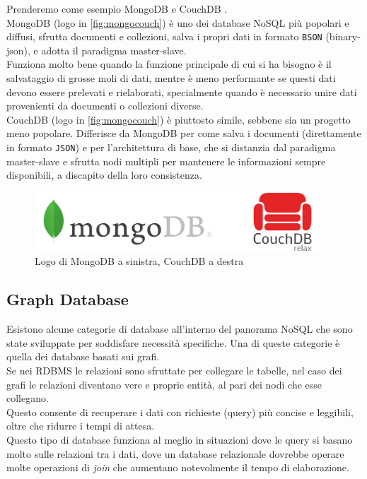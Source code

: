 \noindent Prenderemo come esempio MongoDB \cite{site:udemymongodb} e CouchDB \cite{site:udemycouchdb}.\\
MongoDB (logo in \autoref{fig:mongocouch}) è uno dei database NoSQL più popolari e diffusi, sfrutta documenti e collezioni, salva i propri dati in formato \texttt{BSON} (binary-json), e adotta il paradigma \gls{master-slave}.\\
Funziona molto bene quando la funzione principale di cui si ha bisogno è il salvataggio di grosse moli di dati, mentre è meno performante se questi dati devono essere prelevati e rielaborati, specialmente quando è necessario unire dati provenienti da documenti o collezioni diverse.\\
CouchDB (logo in \autoref{fig:mongocouch}) è piuttosto simile, sebbene sia un progetto meno popolare. Differisce da MongoDB per come salva i documenti (direttamente in formato \texttt{JSON}) e per l'architettura di base, che si distanzia dal paradigma \gls{master-slave} e sfrutta nodi multipli per mantenere le informazioni sempre disponibili, a discapito della loro consistenza.

\begin{figure}[htbp]
\begin{center}
\includegraphics[height=6em]{immagini/tecnologies-logos/MongoDB-CouchDB-Logo.png}
\caption{Logo di MongoDB a sinistra, CouchDB a destra}
\label{fig:mongocouch}
\end{center}
\end{figure}

\subsection{Graph Database}
Esistono alcune categorie di database all'interno del panorama NoSQL che sono state sviluppate per soddisfare necessità specifiche. Una di queste categorie è quella dei database basati sui grafi.\\
Se nei RDBMS le relazioni sono sfruttate per collegare le tabelle, nel caso dei grafi le relazioni diventano vere e proprie entità, al pari dei nodi che esse collegano.\\
Questo consente di recuperare i dati con richieste (query) più concise e leggibili, oltre che ridurre i tempi di attesa.\\
Questo tipo di database funziona al meglio in situazioni dove le query si basano molto sulle relazioni tra i dati, dove un database relazionale dovrebbe operare molte operazioni di \textit{join} che aumentano notevolmente il tempo di elaborazione.\\

